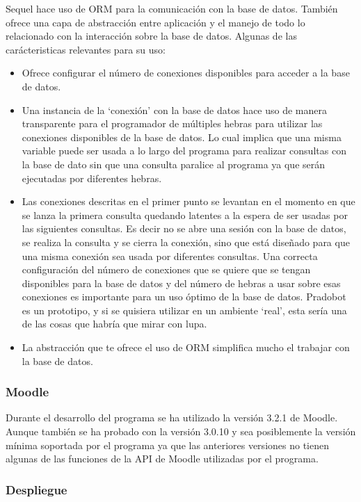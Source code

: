 Sequel hace uso de ORM para la comunicación con la base de datos. También ofrece una capa de  abstracción entre aplicación y el manejo de todo lo relacionado con la interacción sobre la base de datos. Algunas de las carácteristicas relevantes para su uso:

\begin{itemize}
\item Ofrece configurar el número de conexiones disponibles para acceder a la base de datos.\cite{sequel1}
\item Una instancia de la \enquote*{conexión} con la base de datos hace uso de manera transparente para el programador de múltiples hebras para utilizar las conexiones disponibles de la base de datos. Lo cual implica que una misma variable  puede ser usada a lo largo del programa para realizar consultas con la base de dato sin que una consulta paralice al programa ya que serán ejecutadas por diferentes hebras.
\item Las conexiones descritas en el primer punto se levantan en el momento en que se lanza la primera consulta \cite{sequel2} quedando latentes a la espera de ser usadas por las siguientes consultas. Es decir no se abre una sesión con la base de datos, se realiza la consulta y se cierra la conexión, sino que está diseñado para que una misma conexión sea usada por diferentes consultas. Una correcta configuración del número de conexiones que se quiere que se tengan disponibles para la base de datos y del número de hebras a usar sobre esas conexiones es importante para un uso óptimo de la base de datos. Pradobot es un prototipo, y si se quisiera utilizar en un ambiente \enquote*{real}, esta sería una de las cosas que habría que mirar con lupa.
\item La abstracción que te ofrece el uso de ORM simplifica mucho el trabajar con la base de datos.
\end{itemize}

\subsubsection{Moodle}

Durante el desarrollo del programa se ha utilizado la versión 3.2.1 de Moodle. Aunque también se ha probado con la versión 3.0.10 y sea posiblemente la versión mínima soportada por el programa ya que las anteriores versiones no tienen algunas de las funciones de la API de Moodle utilizadas por el programa.


\subsubsection{Despliegue}

